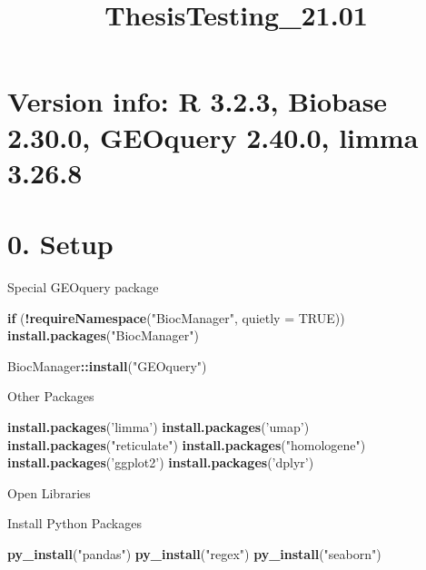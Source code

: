 \documentclass[
]{article}
\title{ThesisTesting\_21.01}
\author{}
\date{\vspace{-2.5em}}
\newenvironment{Shaded}{\begin{snugshade}}{\end{snugshade}}
\newcommand{\ControlFlowTok}[1]{\textcolor[rgb]{0.13,0.29,0.53}{\textbf{#1}}}
\newcommand{\DataTypeTok}[1]{\textcolor[rgb]{0.13,0.29,0.53}{#1}}
\newcommand{\KeywordTok}[1]{\textcolor[rgb]{0.13,0.29,0.53}{\textbf{#1}}}
\newcommand{\NormalTok}[1]{#1}
\newcommand{\OperatorTok}[1]{\textcolor[rgb]{0.81,0.36,0.00}{\textbf{#1}}}
\newcommand{\OtherTok}[1]{\textcolor[rgb]{0.56,0.35,0.01}{#1}}
\newcommand{\StringTok}[1]{\textcolor[rgb]{0.31,0.60,0.02}{#1}}
\begin{document}
\maketitle

\hypertarget{version-info-r-3.2.3-biobase-2.30.0-geoquery-2.40.0-limma-3.26.8}{%
\section{Version info: R 3.2.3, Biobase 2.30.0, GEOquery 2.40.0, limma
3.26.8}\label{version-info-r-3.2.3-biobase-2.30.0-geoquery-2.40.0-limma-3.26.8}}

\hypertarget{setup}{%
\section{0. Setup}\label{setup}}

Special GEOquery package

\begin{Shaded}
\begin{Highlighting}[]
\ControlFlowTok{if}\NormalTok{ (}\OperatorTok{!}\KeywordTok{requireNamespace}\NormalTok{(}\StringTok{"BiocManager"}\NormalTok{, }\DataTypeTok{quietly =} \OtherTok{TRUE}\NormalTok{))}
    \KeywordTok{install.packages}\NormalTok{(}\StringTok{"BiocManager"}\NormalTok{)}

\NormalTok{BiocManager}\OperatorTok{::}\KeywordTok{install}\NormalTok{(}\StringTok{"GEOquery"}\NormalTok{)}
\end{Highlighting}
\end{Shaded}

Other Packages

\begin{Shaded}
\begin{Highlighting}[]
\KeywordTok{install.packages}\NormalTok{(}\StringTok{'limma'}\NormalTok{)}
\KeywordTok{install.packages}\NormalTok{(}\StringTok{'umap'}\NormalTok{)}
\KeywordTok{install.packages}\NormalTok{(}\StringTok{"reticulate"}\NormalTok{)}
\KeywordTok{install.packages}\NormalTok{(}\StringTok{"homologene"}\NormalTok{)}
\KeywordTok{install.packages}\NormalTok{(}\StringTok{'ggplot2'}\NormalTok{)}
\KeywordTok{install.packages}\NormalTok{(}\StringTok{'dplyr'}\NormalTok{)}
\end{Highlighting}
\end{Shaded}

Open Libraries

Install Python Packages

\begin{Shaded}
\begin{Highlighting}[]
\KeywordTok{py_install}\NormalTok{(}\StringTok{"pandas"}\NormalTok{)}
\KeywordTok{py_install}\NormalTok{(}\StringTok{"regex"}\NormalTok{)}
\KeywordTok{py_install}\NormalTok{(}\StringTok{"seaborn"}\NormalTok{)}
\end{Highlighting}
\end{Shaded}
\end{document}
